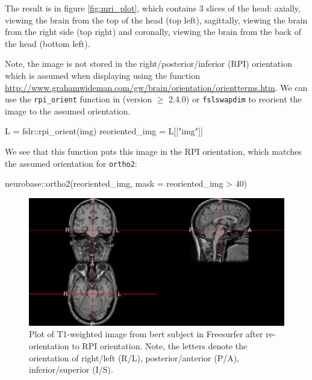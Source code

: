 The result is in figure \ref{fig:mri_plot}, which contains 3 slices of
the head: axially, viewing the brain from the top of the head (top
left), sagittally, viewing the brain from the right side (top right) and
coronally, viewing the brain from the back of the head (bottom left).

Note, the image is not stored in the right/posterior/inferior (RPI)
orientation which is assumed when displaying using the 
 function
\url{http://www.grahamwideman.com/gw/brain/orientation/orientterms.htm}.
We can use the \texttt{rpi\_orient} function in  (version
\(\geq\) 2.4.0) \citep{muschelli2015fslr} or \texttt{fslswapdim} to
reorient the image to the assumed orientation.

\begin{Schunk}
\begin{Sinput}
L = fslr::rpi_orient(img)
reoriented_img = L[["img"]]
\end{Sinput}
\end{Schunk}

We see that this function puts this image in the RPI orientation, which
matches the assumed orientation for \texttt{ortho2}:

\begin{Schunk}
\begin{Sinput}
neurobase::ortho2(reoriented_img, mask = reoriented_img > 40)
\end{Sinput}
\begin{figure}
\includegraphics{Freesurfer_files/figure-latex/mri_plot2-1} \caption[Plot of T1-weighted image from bert subject in Freesurfer after re-orientation to RPI orientation]{Plot of T1-weighted image from bert subject in Freesurfer after re-orientation to RPI orientation.  Note, the letters denote the orientation of right/left (R/L), posterior/anterior (P/A), inferior/superior (I/S). }\label{fig:mri_plot2}
\end{figure}
\end{Schunk}

